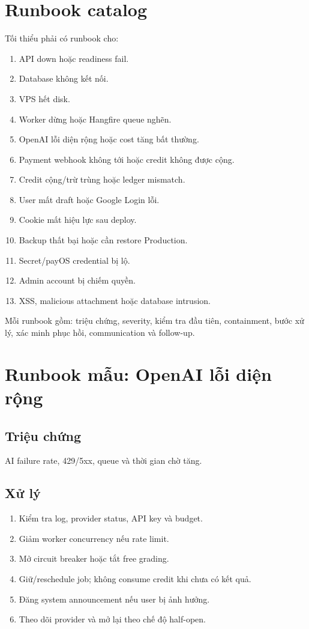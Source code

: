 \documentclass[11pt,a4paper]{article}
\begin{document}
\section{Runbook catalog}

Tối thiểu phải có runbook cho:

\begin{enumerate}
  \item API down hoặc readiness fail.
  \item Database không kết nối.
  \item VPS hết disk.
  \item Worker dừng hoặc Hangfire queue nghẽn.
  \item OpenAI lỗi diện rộng hoặc cost tăng bất thường.
  \item Payment webhook không tới hoặc credit không được cộng.
  \item Credit cộng/trừ trùng hoặc ledger mismatch.
  \item User mất draft hoặc Google Login lỗi.
  \item Cookie mất hiệu lực sau deploy.
  \item Backup thất bại hoặc cần restore Production.
  \item Secret/payOS credential bị lộ.
  \item Admin account bị chiếm quyền.
  \item XSS, malicious attachment hoặc database intrusion.
\end{enumerate}

Mỗi runbook gồm: triệu chứng, severity, kiểm tra đầu tiên, containment, bước xử lý, xác minh phục hồi, communication và follow-up.

\section{Runbook mẫu: OpenAI lỗi diện rộng}

\subsection{Triệu chứng}

AI failure rate, 429/5xx, queue và thời gian chờ tăng.

\subsection{Xử lý}

\begin{enumerate}
  \item Kiểm tra log, provider status, API key và budget.
  \item Giảm worker concurrency nếu rate limit.
  \item Mở circuit breaker hoặc tắt free grading.
  \item Giữ/reschedule job; không consume credit khi chưa có kết quả.
  \item Đăng system announcement nếu user bị ảnh hưởng.
  \item Theo dõi provider và mở lại theo chế độ half-open.
\end{enumerate}
\end{document}
